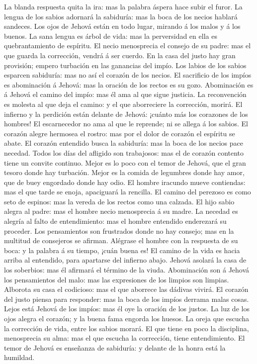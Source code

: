  La blanda respuesta quita la ira: mas la palabra áspera
hace subir el furor.  La lengua de los sabios adornará la
sabiduría: mas la boca de los necios hablará sandeces.  Los
ojos de Jehová están en todo lugar, mirando á los malos y á los buenos.
 La sana lengua es árbol de vida: mas la perversidad en ella
es quebrantamiento de espíritu.  El necio menosprecia el
consejo de su padre: mas el que guarda la corrección, vendrá á ser
cuerdo.  En la casa del justo hay gran provisión; empero
turbación en las ganancias del impío.  Los labios de los
sabios esparcen sabiduría: mas no así el corazón de los necios.
 El sacrificio de los impíos es abominación á Jehová: mas la
oración de los rectos es su gozo.  Abominación es á Jehová
el camino del impío: mas él ama al que sigue justicia.  La
reconvención es molesta al que deja el camino: y el que aborreciere la
corrección, morirá.  El infierno y la perdición están
delante de Jehová: ¡cuánto más los corazones de los hombres!
 El escarnecedor no ama al que le reprende; ni se allega á
los sabios.  El corazón alegre hermosea el rostro: mas por
el dolor de corazón el espíritu se abate.  El corazón
entendido busca la sabiduría: mas la boca de los necios pace necedad.
 Todos los días del afligido son trabajosos: mas el de
corazón contento tiene un convite continuo.  Mejor es lo
poco con el temor de Jehová, que el gran tesoro donde hay turbación.
 Mejor es la comida de legumbres donde hay amor, que de
buey engordado donde hay odio.  El hombre iracundo mueve
contiendas: mas el que tarde se enoja, apaciguará la rencilla.
 El camino del perezoso es como seto de espinos: mas la
vereda de los rectos como una calzada.  El hijo sabio
alegra al padre: mas el hombre necio menosprecia á su madre.
 La necedad es alegría al falto de entendimiento: mas el
hombre entendido enderezará su proceder.  Los pensamientos
son frustrados donde no hay consejo; mas en la multitud de consejeros se
afirman.  Alégrase el hombre con la respuesta de su boca: y
la palabra á su tiempo, ¡cuán buena es!  El camino de la
vida es hacia arriba al entendido, para apartarse del infierno abajo.
 Jehová asolará la casa de los soberbios: mas él afirmará
el término de la viuda.  Abominación son á Jehová los
pensamientos del malo: mas las expresiones de los limpios son limpias.
 Alborota su casa el codicioso: mas el que aborrece las
dádivas vivirá.  El corazón del justo piensa para
responder: mas la boca de los impíos derrama malas cosas. 
Lejos está Jehová de los impíos: mas él oye la oración de los justos.
 La luz de los ojos alegra el corazón; y la buena fama
engorda los huesos.  La oreja que escucha la corrección de
vida, entre los sabios morará.  El que tiene en poco la
disciplina, menosprecia su alma: mas el que escucha la corrección, tiene
entendimiento.  El temor de Jehová es enseñanza de
sabiduría: y delante de la honra está la humildad.

